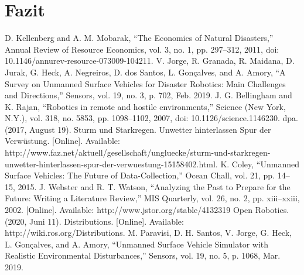 \documentclass[conference]{IEEEtran}
\begin{document}
\section{Fazit}
\begin{thebibliography}{}
 D. Kellenberg and A. M. Mobarak, “The Economics of Natural Disasters,” Annual Review of Resource Economics, vol. 3, no. 1, pp. 297–312, 2011, doi: 10.1146/annurev-resource-073009-104211.
 V. Jorge, R. Granada, R. Maidana, D. Jurak, G. Heck, A. Negreiros, D. dos Santos, L. Gonçalves, and A. Amory, “A Survey on Unmanned Surface Vehicles for Disaster Robotics: Main Challenges and Directions,” Sensors, vol. 19, no. 3, p. 702, Feb. 2019.
 J. G. Bellingham and K. Rajan, “Robotics in remote and hostile environments,” Science (New York, N.Y.), vol. 318, no. 5853, pp. 1098–1102, 2007, doi: 10.1126/science.1146230.
 dpa. (2017, August 19). Sturm und Starkregen. Unwetter hinterlassen Spur der Verwüstung. [Online]. Available: http://www.faz.net/aktuell/gesellschaft/ungluecke/sturm-und-starkregen-unwetter-hinterlassen-spur-der-verwuestung-15158402.html.
 K. Coley, “Unmanned Surface Vehicles: The Future of Data-Collection,” Ocean Chall, vol. 21, pp. 14–15, 2015.
 J. Webster and R. T. Watson, “Analyzing the Past to Prepare for the Future: Writing a Literature Review,” MIS Quarterly, vol. 26, no. 2, pp. xiii–xxiii, 2002. [Online]. Available: http://www.jstor.org/stable/4132319
 Open Robotics. (2020, Juni 11). Distributions. [Online]. Available: http://wiki.ros.org/Distributions.
 M. Paravisi, D. H. Santos, V. Jorge, G. Heck, L. Gonçalves, and A. Amory, “Unmanned Surface Vehicle Simulator with Realistic Environmental Disturbances,” Sensors, vol. 19, no. 5, p. 1068, Mar. 2019.
\end{thebibliography}
\end{document}
